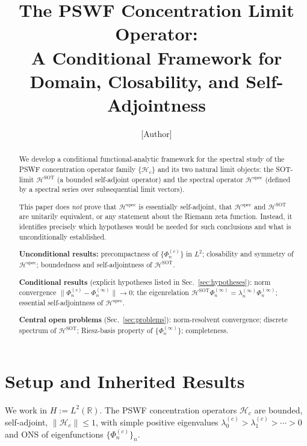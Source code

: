 \documentclass[12pt,a4paper]{amsart}
\theoremstyle{definition}
\theoremstyle{remark}
\newcommand{\Hc}{\mathcal{H}_c}
\newcommand{\Hspec}{\mathcal{H}^{\mathrm{spec}}}
\newcommand{\HSOT}{\mathcal{H}^{\mathrm{SOT}}}
\begin{document}
\title[PSWF Limit Operator: A Conditional Framework]{%
  The PSWF Concentration Limit Operator:\\%
  A Conditional Framework for Domain,
  Closability, and Self-Adjointness}

\author{[Author]}
\address{[Address]}
\email{[Email]}
\maketitle

\begin{abstract}
We develop a conditional functional-analytic framework
for the spectral study of the PSWF concentration
operator family $\{\Hc\}$ and its two natural
limit objects:
the SOT-limit $\HSOT$ (a bounded self-adjoint operator)
and the spectral operator $\Hspec$ (defined by a
spectral series over subsequential limit vectors).

This paper does \emph{not} prove that $\Hspec$
is essentially self-adjoint, that $\Hspec$
and $\HSOT$ are unitarily equivalent, or any
statement about the Riemann zeta function.
Instead, it identifies precisely which
hypotheses would be needed for such conclusions
and what is unconditionally established.

\textbf{Unconditional results:}
precompactness of $\{\Phi_n^{(c)}\}$ in $L^2$;
closability and symmetry of $\Hspec$;
boundedness and self-adjointness of $\HSOT$.

\textbf{Conditional results} (explicit hypotheses
listed in Sec.~\ref{sec:hypotheses}):
norm convergence $\|\Phi_n^{(c)}-\Phi_n^{(\infty)}\|\to 0$;
the eigenrelation $\HSOT\Phi_n^{(\infty)}
=\lambda_n^{(\infty)}\Phi_n^{(\infty)}$;
essential self-adjointness of $\Hspec$.

\textbf{Central open problems}
(Sec.~\ref{sec:problems}):
norm-resolvent convergence;
discrete spectrum of $\HSOT$;
Riesz-basis property of $\{\Phi_n^{(\infty)}\}$;
completeness.
\end{abstract}

\tableofcontents

\section{Setup and Inherited Results}
\label{sec:setup}

We work in $H:=L^2(\mathbb{R})$.
The PSWF concentration operators $\Hc$ are bounded,
self-adjoint, $\|\Hc\|\le 1$, with simple positive
eigenvalues $\lambda_0^{(c)}>\lambda_1^{(c)}>\cdots>0$
and ONS of eigenfunctions $\{\Phi_n^{(c)}\}_n$.
\end{document}
